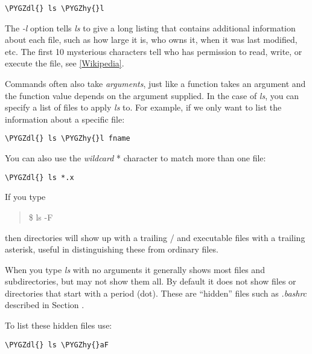 \documentclass[letterpaper,10pt,english]{sphinxmanual}
\def\PYGZdl{\char`\$}
\def\PYGZhy{\char`\-}
\begin{document}
\begin{Verbatim}[commandchars=\\\{\}]
\PYGZdl{} ls \PYGZhy{}l
\end{Verbatim}

The \emph{-l} option tells \emph{ls} to give a long listing that contains additional
information about each file, such as how large it is, who owns it, when it
was last modified, etc.   The first 10 mysterious characters tell who has
permission to read, write, or execute the file, see \href{http://en.wikipedia.org/wiki/File\_system\_permissions}{{[}Wikipedia{]}}.

Commands often also take \emph{arguments}, just like a function takes an argument
and the function value depends on the argument supplied.  In the case of
\emph{ls}, you can specify a list of files to apply \emph{ls} to. For example, if we
only want to list the information about a specific file:

\begin{Verbatim}[commandchars=\\\{\}]
\PYGZdl{} ls \PYGZhy{}l fname
\end{Verbatim}

You can also use the \emph{wildcard} * character to match more than one file:

\begin{Verbatim}[commandchars=\\\{\}]
\PYGZdl{} ls *.x
\end{Verbatim}

If you type
\begin{quote}

\$ ls -F
\end{quote}

then directories will show up with a trailing / and executable files with a
trailing asterisk, useful in distinguishing these from ordinary files.

When you type \emph{ls} with no arguments it generally shows most files and
subdirectories, but may not show them all.  By default it does not show
files or directories that start with a period (dot).  These are ``hidden''
files such as \emph{.bashrc} described in Section {\hyperref[unix:bashrc]{}}.

To list these hidden files use:

\begin{Verbatim}[commandchars=\\\{\}]
\PYGZdl{} ls \PYGZhy{}aF
\end{Verbatim}
\end{document}
